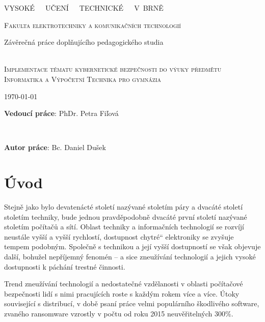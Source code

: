 \documentclass[a4paper, 12pt]{article}
\title{\thesisname}
\author{Bc. Daniel Dušek}
\providecommand{\uv}[1]{\quotedblbase #1\textquotedblleft}
\newcommand\textbox[1]{%
    \parbox{.5\textwidth}{#1}%
}
\newcommand{\thesisName}{Implementace tématu kybernetické bezpečnosti do výuky předmětu Informatika a Výpočetní Technika pro gymnázia}
\newcommand{\universityName}{VYSOKÉ~~~UČENÍ~~~TECHNICKÉ~~~V~BRNĚ}
\newcommand{\facultyName}{Fakulta elektrotechniky a komunikačních technologií}
\begin{document}
\thispagestyle{empty}
    \begin{center}
        \Huge
        \universityName \\
        
        \LARGE
        \textsc{\facultyName\\}
        
        \Large{Závěrečná práce doplňujícího pedagogického studia \\ ~ \\}
        
        \LARGE
        \textsc{\thesisName}
    \end{center}

        \noindent \textbox{\today}  \textbox{\hfill \textbf{Vedoucí práce}: PhDr. Petra Fiľová} \\
        \noindent \textbox{\hfill}  \textbox{\hfill \textbf{Autor práce}: Bc. Daniel Dušek ~~~~~}
\clearpage
\restoregeometry

\newpage
\thispagestyle{empty}
\tableofcontents

\newpage
\setcounter{page}{1}
\section{Úvod}

Stejně jako bylo devatenácté století nazývané stoletím páry a dvacáté století stoletím techniky, bude jednou pravděpodobně dvacáté první století nazývané stoletím počítačů a sítí. Oblast techniky a informačních technologií se rozvíjí neustále vyšší a vyšší rychlostí, dostupnost \uv{chytré} elektroniky se zvyšuje tempem podobným. Společně s technikou a její vyšší dostupností se však objevuje další, bohužel nepříjemný fenomén -- a sice zneužívání technologií a jejich vysoké dostupnosti k páchání trestné činnosti. 

Trend zneužívání technologií a nedostatečné vzdělanosti v oblasti počítačové bezpečnosti lidí s nimi pracujících roste s každým rokem více a více. Útoky související s distribucí, v době psaní práce velmi populárního škodlivého software, zvaného ransomware vzrostly v počtu od roku 2015 neuvěřitelných 300$\%$.
\end{document}
